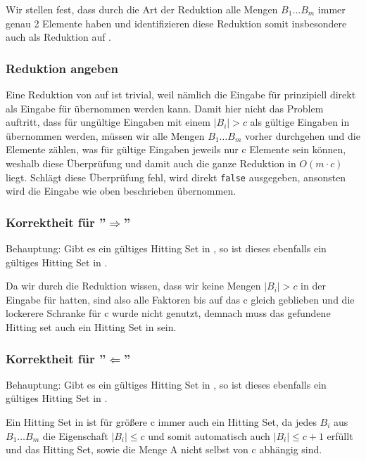 \documentclass[a4paper]{article}
\begin{document}
		Wir stellen fest, dass durch die Art der Reduktion alle Mengen $B_1 \dots B_m$ immer genau 2 Elemente haben und identifizieren diese Reduktion somit insbesondere auch als Reduktion auf \twohitset .
		
		\subsubsection{Reduktion angeben}
		Eine Reduktion von \chitset auf \cpohitset ist trivial, weil nämlich die Eingabe für \chitset prinzipiell direkt als Eingabe für \cpohitset übernommen werden kann. Damit hier nicht das Problem auftritt, dass für \chitset ungültige Eingaben mit einem $|B_i| > c $ als gültige Eingaben in \cpohitset übernommen werden, müssen wir alle Mengen $B_1 \dots B_m$ vorher durchgehen und die Elemente zählen, was für gültige Eingaben jeweils nur c Elemente sein können, weshalb diese Überprüfung und damit auch die ganze Reduktion in $O(m \cdot c)$ liegt. Schlägt diese Überprüfung fehl, wird direkt \texttt{false} ausgegeben, ansonsten wird die Eingabe wie oben beschrieben übernommen.
		\subsubsection{Korrektheit für ''$\Rightarrow$''}
		Behauptung: Gibt es ein gültiges Hitting Set in \cpohitset , so ist dieses ebenfalls ein gültiges Hitting Set in \chitset . \n
		
		Da wir durch die Reduktion wissen, dass wir keine Mengen $|B_i| > c $ in der Eingabe für \cpohitset hatten, sind also alle Faktoren bis auf das c gleich geblieben und die lockerere Schranke für c wurde nicht genutzt, demnach muss das gefundene Hitting set auch ein Hitting Set in \chitset sein.
		
		\subsubsection{Korrektheit für ''$\Leftarrow$''}
		Behauptung: Gibt es ein gültiges Hitting Set in \chitset , so ist dieses ebenfalls ein gültiges Hitting Set in \cpohitset . \n
		
		Ein Hitting Set in \chitset ist für größere c immer auch ein Hitting Set, da  jedes $B_i$ aus $B_1 \dots B_m$ die Eigenschaft $|B_i|\leq c$ und somit automatisch auch $|B_i|\leq c+1$ erfüllt und das Hitting Set, sowie die Menge A nicht selbst von c abhängig sind.
		
		
	\section{}
\end{document}
